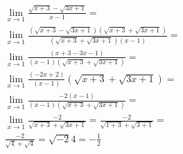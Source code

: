 \begin{ex}
\begin{align}
&\lim_{x\rightarrow 1} \frac{\sqrt{x+3}-\sqrt{3x+1}}{x-1}=\nonumber\\
&\lim_{x\rightarrow 1} \frac{(\sqrt{x+3}-\sqrt{3x+1})(\sqrt{x+3}+\sqrt{3x+1})}{(\sqrt{x+3}+\sqrt{3x+1})(x-1)}=\nonumber\\
&\lim_{x\rightarrow 1} \frac{(x+3-3x-1)}{(x-1)(\sqrt{x+3}+\sqrt{3x+1})}=\nonumber\\
&\lim_{x\rightarrow 1} \frac{(-2x+2)}{(x-1)}(\sqrt{x+3}+\sqrt{3x+1})=\nonumber\\
&\lim_{x\rightarrow 1} \frac{-2(x-1)}{(x-1)(\sqrt{x+3}+\sqrt{3x+1})}=\nonumber\\
&\lim_{x\rightarrow 1} \frac{-2}{\sqrt{x+3}+\sqrt{3x+1}}=\frac{-2}{\sqrt{1+3}+\sqrt{3+1}}=\nonumber\\
&\frac{-2}{\sqrt{4}+\sqrt{4}}=\sqrt{-2}{4}=-\frac{1}{2}\nonumber
\end{align}
\end{ex}
